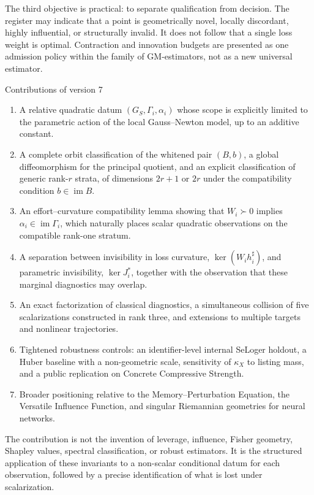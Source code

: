 \documentclass[10pt,a4paper]{article}
\newcommand{\Ker}{\operatorname{ker}}
\newcommand{\Img}{\operatorname{im}}
\begin{document}
The third objective is practical: to separate qualification from decision. The register may indicate that a point is geometrically novel, locally discordant, highly influential, or structurally invalid. It does not follow that a single loss weight is optimal. Contraction and innovation budgets are presented as one admission policy within the family of GM-estimators, not as a new universal estimator.

\begin{statementbox}{Contributions of version 7}
\begin{enumerate}
  \item A relative quadratic datum $(G_S,\Gamma_i,\alpha_i)$ whose scope is explicitly limited to the parametric action of the local Gauss--Newton model, up to an additive constant.
  \item A complete orbit classification of the whitened pair $(B,b)$, a global diffeomorphism for the principal quotient, and an explicit classification of generic rank-$r$ strata, of dimensions $2r+1$ or $2r$ under the compatibility condition $b\in\Img B$.
  \item An effort--curvature compatibility lemma showing that $W_i\succ0$ implies $\alpha_i\in\Img\Gamma_i$, which naturally places scalar quadratic observations on the compatible rank-one stratum.
  \item A separation between invisibility in loss curvature, $\Ker(W_ih_i^\sharp)$, and parametric invisibility, $\Ker J_i^*$, together with the observation that these marginal diagnostics may overlap.
  \item An exact factorization of classical diagnostics, a simultaneous collision of five scalarizations constructed in rank three, and extensions to multiple targets and nonlinear trajectories.
  \item Tightened robustness controls: an identifier-level internal SeLoger holdout, a Huber baseline with a non-geometric scale, sensitivity of $\kappa_X$ to listing mass, and a public replication on Concrete Compressive Strength.
  \item Broader positioning relative to the Memory--Perturbation Equation, the Versatile Influence Function, and singular Riemannian geometries for neural networks.
\end{enumerate}
\end{statementbox}

The contribution is not the invention of leverage, influence, Fisher geometry, Shapley values, spectral classification, or robust estimators. It is the structured application of these invariants to a non-scalar conditional datum for each observation, followed by a precise identification of what is lost under scalarization.
\end{document}
